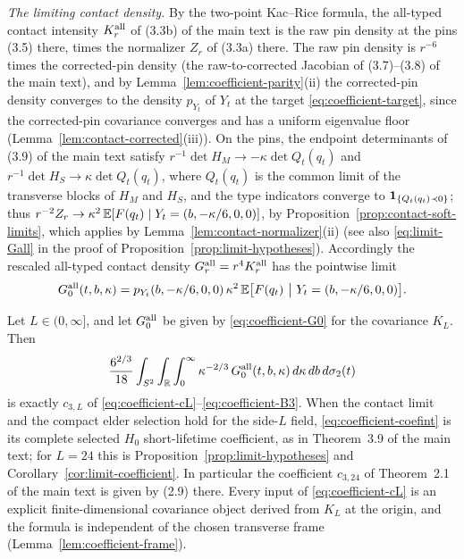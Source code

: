\emph{The limiting contact density.} By the two-point Kac--Rice formula, the all-typed contact intensity $K^{\rm all}_r$ of (3.3b) of the main text is the raw pin density at the pins (3.5) there, times the normalizer $Z_r$ of (3.3a) there. The raw pin density is $r^{-6}$ times the corrected-pin density (the raw-to-corrected Jacobian of (3.7)--(3.8) of the main text), and by Lemma~\ref{lem:coefficient-parity}(ii) the corrected-pin density converges to the density $p_{Y_t}$ of $Y_t$ at the target \eqref{eq:coefficient-target}, since the corrected-pin covariance converges and has a uniform eigenvalue floor (Lemma~\ref{lem:contact-corrected}(iii)). On the pins, the endpoint determinants of (3.9) of the main text satisfy $r^{-1}\det H_M\to-\kappa\det Q_t(q_t)$ and $r^{-1}\det H_S\to\kappa\det Q_t(q_t)$, where $Q_t(q_t)$ is the common limit of the transverse blocks of $H_M$ and $H_S$, and the type indicators converge to $\mathbf 1_{\{Q_t(q_t)\prec0\}}$; thus $r^{-2}Z_r\to\kappa^2\,\mathbb E[F(q_t)\mid Y_t=(b,-\kappa/6,0,0)]$, by Proposition~\ref{prop:contact-soft-limits}, which applies by Lemma~\ref{lem:contact-normalizer}(ii) (see also \eqref{eq:limit-Gall} in the proof of Proposition~\ref{prop:limit-hypotheses}). Accordingly the rescaled all-typed contact density $G^{\rm all}_r=r^4K^{\rm all}_r$ has the pointwise limit
\begin{equation}\label{eq:coefficient-G0}
G^{\rm all}_0(t,b,\kappa)=p_{Y_t}(b,-\kappa/6,0,0)\,\kappa^2\,\E\bigl[F(q_t)\ \big|\ Y_t=(b,-\kappa/6,0,0)\bigr].
\end{equation}

\begin{theorem}\label{thm:coefficient-main}
Let $L\in(0,\infty]$, and let $G^{\rm all}_0$ be given by \eqref{eq:coefficient-G0} for the covariance $K_L$. Then
\begin{equation}\label{eq:coefficient-coefint}
\frac{6^{2/3}}{18}\int_{S^2}\int_{\mathbb R}\int_0^\infty\kappa^{-2/3}\,G^{\rm all}_0(t,b,\kappa)\,d\kappa\,db\,d\sigma_2(t)
\end{equation}
is exactly $c_{3,L}$ of \eqref{eq:coefficient-cL}--\eqref{eq:coefficient-B3}. When the contact limit and the compact elder selection hold for the side-$L$ field, \eqref{eq:coefficient-coefint} is its complete selected $H_0$ short-lifetime coefficient, as in Theorem~3.9 of the main text; for $L=24$ this is Proposition~\ref{prop:limit-hypotheses} and Corollary~\ref{cor:limit-coefficient}. In particular the coefficient $c_{3,24}$ of Theorem~2.1 of the main text is given by (2.9) there. Every input of \eqref{eq:coefficient-cL} is an explicit finite-dimensional covariance object derived from $K_L$ at the origin, and the formula is independent of the chosen transverse frame (Lemma~\ref{lem:coefficient-frame}).
\end{theorem}

